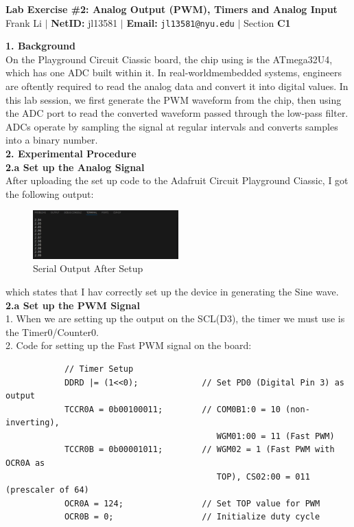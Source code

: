 \documentclass{report}
\begin{document}
    \begin{center}
        \textbf{\huge Lab Exercise \#2: Analog Output (PWM), Timers and Analog Input} \\[1em]
        Frank Li $|$
        \textbf{NetID:} jl13581 $|$
        \textbf{Email:} \texttt{jl13581@nyu.edu} $|$
        Section \textbf{C1} \\ [1em]
    \end{center}

    \begin{paracol}{2}
        {\Large \textbf{1. Background}}\\[0.5em]
        On the Playground Circuit Ciassic board, the chip using is the ATmega32U4, which has one ADC built within it. In real-worldmembedded systems, engineers are oftently required to read the analog data and convert it into digital values. In this lab session, we first generate the PWM waveform from the chip, then using the ADC port to read the converted waveform passed through the low-pass filter. ADCs operate by sampling the  signal at regular intervals and converts samples into a binary number.\\[1em]
        {\Large \textbf{2. Experimental Procedure}}\\[0.5em]
        {\Large \textbf{2.a Set up the Analog Signal}}\\[0.5em]
        After uploading the set up code to the Adafruit Circuit Playground Ciassic, I got the following output:
        \begin{figure}[H]
            \centering
            \includegraphics[width = 0.5\textwidth]{setup.png}
            \caption{Serial Output After Setup}
        \end{figure}
        which states that I hav correctly set up the device in generating the Sine wave.\\[0.5em]
        {\Large \textbf{2.a Set up the PWM Signal}}\\[0.5em]
        1. When we are setting up the output on the SCL(D3), the timer we must use is the Timer0/Counter0.\\[0.5em]
        2. Code for setting up the Fast PWM signal on the board:\\[0.5em]
        \begin{verbatim}
            // Timer Setup
            DDRD |= (1<<0);             // Set PD0 (Digital Pin 3) as output
            TCCR0A = 0b00100011;        // COM0B1:0 = 10 (non-inverting), 
                                           WGM01:00 = 11 (Fast PWM)
            TCCR0B = 0b00001011;        // WGM02 = 1 (Fast PWM with OCR0A as 
                                           TOP), CS02:00 = 011 (prescaler of 64)
            OCR0A = 124;                // Set TOP value for PWM
            OCR0B = 0;                  // Initialize duty cycle
           \end{verbatim}

    \end{paracol}
\end{document}
